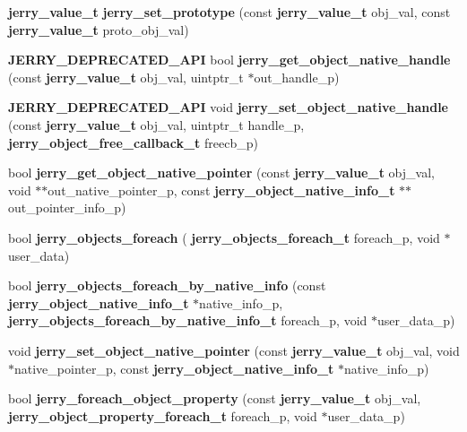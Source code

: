 \begin{DoxyCompactItemize}
\textbf{ jerry\+\_\+value\+\_\+t} {\bfseries jerry\+\_\+set\+\_\+prototype} (const \textbf{ jerry\+\_\+value\+\_\+t} obj\+\_\+val, const \textbf{ jerry\+\_\+value\+\_\+t} proto\+\_\+obj\+\_\+val)
\item 
\mbox{\label{group___core_gaba0c902e537fe7b0600588b93693ce95}} 
\textbf{ J\+E\+R\+R\+Y\+\_\+\+D\+E\+P\+R\+E\+C\+A\+T\+E\+D\+\_\+\+A\+PI} bool {\bfseries jerry\+\_\+get\+\_\+object\+\_\+native\+\_\+handle} (const \textbf{ jerry\+\_\+value\+\_\+t} obj\+\_\+val, uintptr\+\_\+t $\ast$out\+\_\+handle\+\_\+p)
\item 
\mbox{\label{group___core_ga9b90c2dbeb167b1fe3480ff926949c6b}} 
\textbf{ J\+E\+R\+R\+Y\+\_\+\+D\+E\+P\+R\+E\+C\+A\+T\+E\+D\+\_\+\+A\+PI} void {\bfseries jerry\+\_\+set\+\_\+object\+\_\+native\+\_\+handle} (const \textbf{ jerry\+\_\+value\+\_\+t} obj\+\_\+val, uintptr\+\_\+t handle\+\_\+p, \textbf{ jerry\+\_\+object\+\_\+free\+\_\+callback\+\_\+t} freecb\+\_\+p)
\item 
\mbox{\label{group___core_gaf93dafdb4afe04106a864d3145333fa0}} 
bool {\bfseries jerry\+\_\+get\+\_\+object\+\_\+native\+\_\+pointer} (const \textbf{ jerry\+\_\+value\+\_\+t} obj\+\_\+val, void $\ast$$\ast$out\+\_\+native\+\_\+pointer\+\_\+p, const \textbf{ jerry\+\_\+object\+\_\+native\+\_\+info\+\_\+t} $\ast$$\ast$out\+\_\+pointer\+\_\+info\+\_\+p)
\item 
\mbox{\label{group___core_ga537f03108ffa5356dfd77b1762361efa}} 
bool {\bfseries jerry\+\_\+objects\+\_\+foreach} (\textbf{ jerry\+\_\+objects\+\_\+foreach\+\_\+t} foreach\+\_\+p, void $\ast$user\+\_\+data)
\item 
\mbox{\label{group___core_ga67630ba87b13b754701e054bd6897a8f}} 
bool {\bfseries jerry\+\_\+objects\+\_\+foreach\+\_\+by\+\_\+native\+\_\+info} (const \textbf{ jerry\+\_\+object\+\_\+native\+\_\+info\+\_\+t} $\ast$native\+\_\+info\+\_\+p, \textbf{ jerry\+\_\+objects\+\_\+foreach\+\_\+by\+\_\+native\+\_\+info\+\_\+t} foreach\+\_\+p, void $\ast$user\+\_\+data\+\_\+p)
\item 
\mbox{\label{group___core_ga1feb6f62bb0579ed56f92ff3ef2faa70}} 
void {\bfseries jerry\+\_\+set\+\_\+object\+\_\+native\+\_\+pointer} (const \textbf{ jerry\+\_\+value\+\_\+t} obj\+\_\+val, void $\ast$native\+\_\+pointer\+\_\+p, const \textbf{ jerry\+\_\+object\+\_\+native\+\_\+info\+\_\+t} $\ast$native\+\_\+info\+\_\+p)
\item 
\mbox{\label{group___core_gad6ca645df5077471b54d225a445b8b4b}} 
bool {\bfseries jerry\+\_\+foreach\+\_\+object\+\_\+property} (const \textbf{ jerry\+\_\+value\+\_\+t} obj\+\_\+val, \textbf{ jerry\+\_\+object\+\_\+property\+\_\+foreach\+\_\+t} foreach\+\_\+p, void $\ast$user\+\_\+data\+\_\+p)

\end{DoxyCompactItemize}
